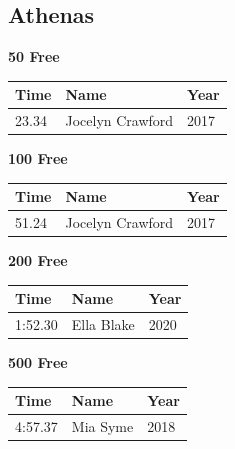 \subsection{Athenas}
\vspace{1.2em}
\noindent\begin{minipage}[t]{0.48\textwidth}
\centering
\textbf{\textcolor{teamprimary}{50 Free}}\par
\vspace{0.5em}
\centering
\small
\renewcommand{\arraystretch}{1.0}
\setlength{\tabcolsep}{4pt}
\begin{tabular}{@{}p{1.8cm}p{3.0cm}p{1.0cm}@{}}
\toprule
\textbf{Time} & \textbf{Name} & \textbf{Year} \\
\midrule
23.34 & Jocelyn Crawford & 2017 \\
\bottomrule
\end{tabular}
\end{minipage}
\hfill
\begin{minipage}[t]{0.48\textwidth}
\centering
\textbf{\textcolor{teamprimary}{100 Free}}\par
\vspace{0.5em}
\centering
\small
\renewcommand{\arraystretch}{1.0}
\setlength{\tabcolsep}{4pt}
\begin{tabular}{@{}p{1.8cm}p{3.0cm}p{1.0cm}@{}}
\toprule
\textbf{Time} & \textbf{Name} & \textbf{Year} \\
\midrule
51.24 & Jocelyn Crawford & 2017 \\
\bottomrule
\end{tabular}
\end{minipage}
\vspace{0.3em}
\vspace{1.2em}
\noindent\begin{minipage}[t]{0.48\textwidth}
\centering
\textbf{\textcolor{teamprimary}{200 Free}}\par
\vspace{0.5em}
\centering
\small
\renewcommand{\arraystretch}{1.0}
\setlength{\tabcolsep}{4pt}
\begin{tabular}{@{}p{1.8cm}p{3.0cm}p{1.0cm}@{}}
\toprule
\textbf{Time} & \textbf{Name} & \textbf{Year} \\
\midrule
1:52.30 & Ella Blake & 2020 \\
\bottomrule
\end{tabular}
\end{minipage}
\hfill
\begin{minipage}[t]{0.48\textwidth}
\centering
\textbf{\textcolor{teamprimary}{500 Free}}\par
\vspace{0.5em}
\centering
\small
\renewcommand{\arraystretch}{1.0}
\setlength{\tabcolsep}{4pt}
\begin{tabular}{@{}p{1.8cm}p{3.0cm}p{1.0cm}@{}}
\toprule
\textbf{Time} & \textbf{Name} & \textbf{Year} \\
\midrule
4:57.37 & Mia Syme & 2018 \\
\bottomrule
\end{tabular}
\end{minipage}
